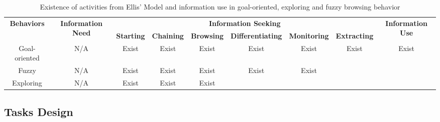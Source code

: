 \begin{table}[H]
    \small
    \centering
    \caption{Existence of activities from Ellis' Model and information use in 
    goal-oriented, exploring and fuzzy browsing behavior}
    \begin{adjustbox}{width=\textwidth}
        \begin{tabular}{ccccccccc}
            \toprule
            \multicolumn{1}{c}{\multirow{2}{*}{\textbf{Behaviors}}}  & \multicolumn{1}{c}{\multirow{2}{*}{\textbf{Information Need}}} & \multicolumn{6}{c}{\textbf{Information Seeking}}                                    & \multicolumn{1}{c}{\multirow{2}{*}{\textbf{Information Use}}} \\ \cline{3-8}
            \multicolumn{1}{c}{}                                     & \multicolumn{1}{c}{}                                  & \textbf{Starting} & \textbf{Chaining} & \textbf{Browsing} & \textbf{Differentiating} & \textbf{Monitoring} & \textbf{Extracting} & \multicolumn{1}{c}{}  \\
            \hline
            Goal-oriented                                            &   N/A                                                 &     Exist         &      Exist        &   Exist           &        Exist               &       Exist           &        Exist          &      Exist              \\
            Fuzzy                                                &   N/A                                                 &     Exist         &      Exist        &   Exist           &        Exist               &       Exist           &                     &                       \\
            Exploring                                                    &   N/A                                                 &     Exist         &      Exist        &   Exist           &                          &                     &                     &                       \\
            \bottomrule
        \end{tabular}
        \label{table:ellis}
    \end{adjustbox}
\end{table}

\subsection{Tasks Design}
\label{sec:task-design}

